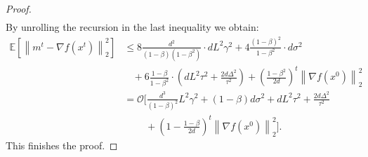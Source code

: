 \documentclass{article}
\theoremstyle{plain}
\theoremstyle{definition}
\theoremstyle{remark}
\newcommand{\expect}[1]{\mathbb{E}\left[ #1 \right]}
\newcommand{\norm}[1]{\left\| #1 \right\|}
\begin{document}
\begin{proof}
\begin{align*}
        \end{align*}
        By unrolling the recursion in the last inequality we obtain:
        \begin{align*}
            \expect{\norm{m^t - \nabla f(x^t)}_2^2}
            &\leq
            8 \frac{d^2}{(1 - \beta)(1 - \beta^2)} \cdot d L^2 \gamma^2 
            +
            4 \frac{(1-\beta)^2}{1 - \beta^2} \cdot  d \sigma^2
            \\&~~~~+
            6 \frac{1 - \beta}{1 - \beta^2} \cdot \left( 
                d L^2 \tau^2 
                + \frac{2 d \Delta^2}{\tau^2} 
            \right)
            +
            \left( \frac{1 - \beta^2}{2d} \right)^t \norm{\nabla f(x^0)}_2^2
            \\&=
            \mathcal{O}\Bigg[ 
                \frac{d^3}{(1-\beta)^2} L^2 \gamma^2  
                +
                (1-\beta)d \sigma^2
                +
                d L^2 \tau^2 
                +
                \frac{2 d \Delta^2}{\tau^2} 
                \\&~~~~~~~~~~+ 
                \left( 1 - \frac{1 - \beta}{2d} \right)^t \norm{\nabla f(x^0)}_2^2
            \Bigg] .
        \end{align*}
        This finishes the proof.
    \end{proof}
\end{document}

